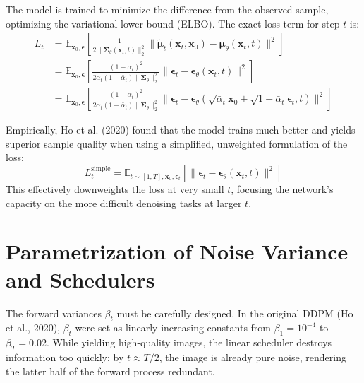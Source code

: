 The model is trained to minimize the difference from the observed sample, optimizing the variational lower bound (ELBO). The exact loss term for step $t$ is:
\begin{align}
    L_t &= \mathbb{E}_{\mathbf{x}_0, \boldsymbol{\epsilon}} \left[ \frac{1}{2\|\mathbf{\Sigma}_\theta(\mathbf{x}_t, t)\|_2^2} \|\tilde{\boldsymbol{\mu}}_t(\mathbf{x}_t, \mathbf{x}_0) - \boldsymbol{\mu}_\theta(\mathbf{x}_t, t)\|^2 \right] \\
        &= \mathbb{E}_{\mathbf{x}_0, \boldsymbol{\epsilon}} \left[ \frac{(1 - \alpha_t)^2}{2\alpha_t(1 - \bar{\alpha}_t)\|\mathbf{\Sigma}_\theta\|_2^2} \|\boldsymbol{\epsilon}_t - \boldsymbol{\epsilon}_\theta(\mathbf{x}_t, t)\|^2 \right] \\
        &= \mathbb{E}_{\mathbf{x}_0, \boldsymbol{\epsilon}} \left[ \frac{(1 - \alpha_t)^2}{2\alpha_t(1 - \bar{\alpha}_t)\|\mathbf{\Sigma}_\theta\|_2^2} \|\boldsymbol{\epsilon}_t - \boldsymbol{\epsilon}_\theta(\sqrt{\bar{\alpha}_t}\mathbf{x}_0 + \sqrt{1-\bar{\alpha}_t}\boldsymbol{\epsilon}_t, t)\|^2 \right]
\end{align}

\begin{insightbox}
Empirically, Ho et al. (2020) found that the model trains much better and yields superior sample quality when using a simplified, unweighted formulation of the loss:
\begin{equation}
    L_t^{\text{simple}} = \mathbb{E}_{t \sim [1,T], \mathbf{x}_0, \boldsymbol{\epsilon}_t} \left[ \|\boldsymbol{\epsilon}_t - \boldsymbol{\epsilon}_\theta(\mathbf{x}_t, t)\|^2 \right]
\end{equation}
This effectively downweights the loss at very small $t$, focusing the network's capacity on the more difficult denoising tasks at larger $t$.
\end{insightbox}

\section{Parametrization of Noise Variance and Schedulers}

The forward variances $\beta_t$ must be carefully designed. In the original DDPM (Ho et al., 2020), $\beta_t$ were set as linearly increasing constants from $\beta_1 = 10^{-4}$ to $\beta_T = 0.02$. While yielding high-quality images, the linear scheduler destroys information too quickly; by $t \approx T/2$, the image is already pure noise, rendering the latter half of the forward process redundant.

